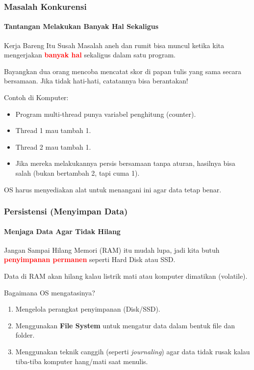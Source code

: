 \documentclass[t,aspectratio=169,xcolor=dvipsnames]{beamer}
\newcommand{\tem}[1]{\textbf{\textcolor{red}{#1}}}
\begin{document}
\begin{frame}[t]
    \frametitle{Masalah Konkurensi}
    \framesubtitle{Tantangan Melakukan Banyak Hal Sekaligus}
    
    \begin{block}{Kerja Bareng Itu Susah}
        Masalah aneh dan rumit bisa muncul ketika kita mengerjakan \tem{banyak hal} sekaligus dalam satu program.
    \end{block}
    \vspace{0.1cm}
    
    \small
    Bayangkan dua orang mencoba mencatat skor di papan tulis yang sama secara bersamaan. Jika tidak hati-hati, catatannya bisa berantakan!
    
    \vspace{0.1cm}
    Contoh di Komputer:
    \scriptsize
    \begin{itemize}
        \item Program multi-thread punya variabel penghitung (counter).
        \item Thread 1 mau tambah 1.
        \item Thread 2 mau tambah 1.
        \item Jika mereka melakukannya persis bersamaan tanpa aturan, hasilnya bisa salah (bukan bertambah 2, tapi cuma 1).
    \end{itemize}
    OS harus menyediakan alat untuk menangani ini agar data tetap benar.
\end{frame}

\begin{frame}[t]
    \frametitle{Persistensi (Menyimpan Data)}
    \framesubtitle{Menjaga Data Agar Tidak Hilang}
    
    \begin{exampleblock}{Jangan Sampai Hilang}
        Memori (RAM) itu mudah lupa, jadi kita butuh \tem{penyimpanan permanen} seperti Hard Disk atau SSD.
    \end{exampleblock}
    \vspace{0.3cm}
    
    \small
    Data di RAM akan hilang kalau listrik mati atau komputer dimatikan (volatile).
    
    Bagaimana OS mengatasinya?
    \begin{enumerate}
        \item Mengelola perangkat penyimpanan (Disk/SSD).
        \item Menggunakan \textbf{File System} untuk mengatur data dalam bentuk file dan folder.
        \item Menggunakan teknik canggih (seperti \textit{journaling}) agar data tidak rusak kalau tiba-tiba komputer hang/mati saat menulis.
    \end{enumerate}
\end{frame}
\end{document}
